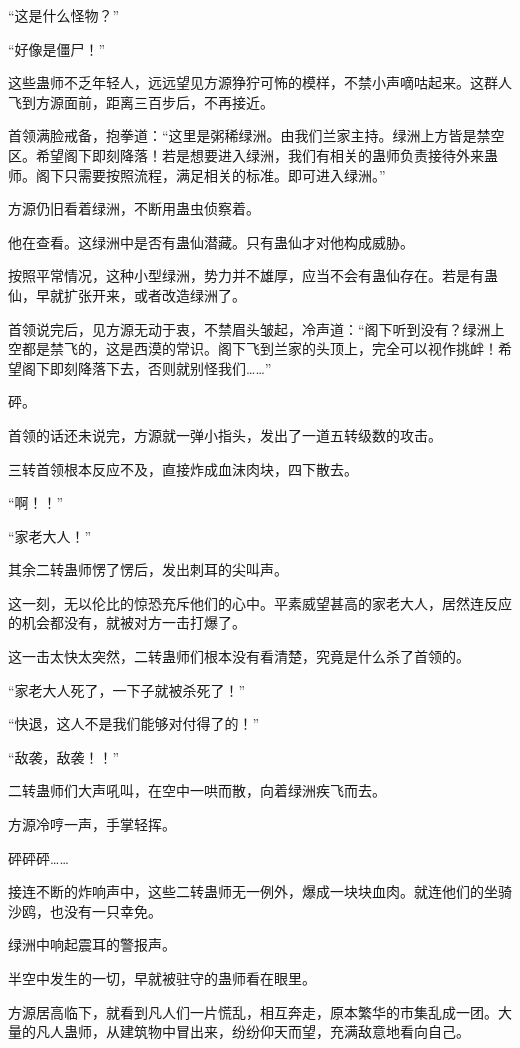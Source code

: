 \begin{this_body}
“这是什么怪物？”

“好像是僵尸！”

这些蛊师不乏年轻人，远远望见方源狰狞可怖的模样，不禁小声嘀咕起来。这群人飞到方源面前，距离三百步后，不再接近。

首领满脸戒备，抱拳道：“这里是粥稀绿洲。由我们兰家主持。绿洲上方皆是禁空区。希望阁下即刻降落！若是想要进入绿洲，我们有相关的蛊师负责接待外来蛊师。阁下只需要按照流程，满足相关的标准。即可进入绿洲。”

方源仍旧看着绿洲，不断用蛊虫侦察着。

他在查看。这绿洲中是否有蛊仙潜藏。只有蛊仙才对他构成威胁。

按照平常情况，这种小型绿洲，势力并不雄厚，应当不会有蛊仙存在。若是有蛊仙，早就扩张开来，或者改造绿洲了。

首领说完后，见方源无动于衷，不禁眉头皱起，冷声道：“阁下听到没有？绿洲上空都是禁飞的，这是西漠的常识。阁下飞到兰家的头顶上，完全可以视作挑衅！希望阁下即刻降落下去，否则就别怪我们……”

砰。

首领的话还未说完，方源就一弹小指头，发出了一道五转级数的攻击。

三转首领根本反应不及，直接炸成血沫肉块，四下散去。

“啊！！”

“家老大人！”

其余二转蛊师愣了愣后，发出刺耳的尖叫声。

这一刻，无以伦比的惊恐充斥他们的心中。平素威望甚高的家老大人，居然连反应的机会都没有，就被对方一击打爆了。

这一击太快太突然，二转蛊师们根本没有看清楚，究竟是什么杀了首领的。

“家老大人死了，一下子就被杀死了！”

“快退，这人不是我们能够对付得了的！”

“敌袭，敌袭！！”

二转蛊师们大声吼叫，在空中一哄而散，向着绿洲疾飞而去。

方源冷哼一声，手掌轻挥。

砰砰砰……

接连不断的炸响声中，这些二转蛊师无一例外，爆成一块块血肉。就连他们的坐骑沙鸥，也没有一只幸免。

绿洲中响起震耳的警报声。

半空中发生的一切，早就被驻守的蛊师看在眼里。

方源居高临下，就看到凡人们一片慌乱，相互奔走，原本繁华的市集乱成一团。大量的凡人蛊师，从建筑物中冒出来，纷纷仰天而望，充满敌意地看向自己。


\end{this_body}
